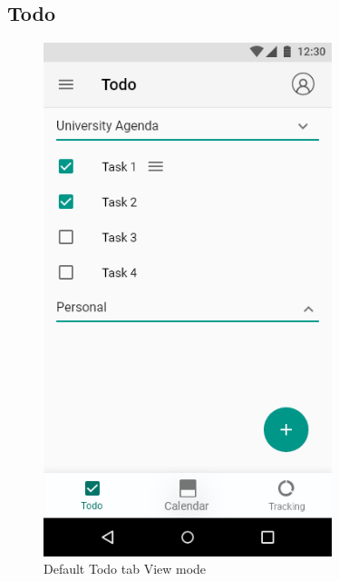 \documentclass[a4paper,11pt]{article} %
\begin{document}
\subsection{Todo}
\begin{figure}[h!]
  \centering
  \includegraphics[width=0.75\textwidth]{img/ui-wireframe/Todo.png}
  \caption{Default Todo tab View mode}
\end{figure}
\end{document}
